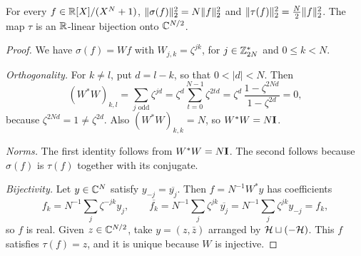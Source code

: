 \begin{lemma}\label{lem:parseval}
For every $f\in\mathbb{R}[X]/(X^N+1)$, $\lVert \sigma(f)\rVert_2^2=N\lVert f\rVert_2^2$ and $\lVert \tau(f)\rVert_2^2=\tfrac N2\lVert f\rVert_2^2$. The map $\tau$ is an $\mathbb{R}$-linear bijection onto $\mathbb{C}^{N/2}$.
\end{lemma}
\begin{proof}
We have $\sigma(f)=Wf$ with $W_{j,k}=\zeta^{jk}$, for $j\in\mathbb{Z}_{2N}^*$ and $0\le k<N$.

\emph{Orthogonality.} For $k\ne l$, put $d=l-k$, so that $0<|d|<N$. Then
\[
  (W^*W)_{k,l}=\sum_{j\text{ odd}}\zeta^{jd}=\zeta^{d}\sum_{t=0}^{N-1}\zeta^{2td}=\zeta^d\,\frac{1-\zeta^{2Nd}}{1-\zeta^{2d}}=0,
\]
because $\zeta^{2Nd}=1\ne\zeta^{2d}$. Also $(W^*W)_{k,k}=N$, so $W^*W=N\mathbf{I}$.

\emph{Norms.} The first identity follows from $W^*W=N\mathbf{I}$. The second follows because $\sigma(f)$ is $\tau(f)$ together with its conjugate.

\emph{Bijectivity.} Let $y\in\mathbb{C}^N$ satisfy $y_{-j}=\overline{y_j}$. Then $f=N^{-1}W^*y$ has coefficients
\[
  f_k=N^{-1}\sum_j\zeta^{-jk}y_j,\qquad \overline{f_k}=N^{-1}\sum_j\zeta^{jk}\,\overline{y_j}=N^{-1}\sum_j\zeta^{jk}y_{-j}=f_k,
\]
so $f$ is real. Given $z\in\mathbb{C}^{N/2}$, take $y=(z,\bar z)$ arranged by $\mathcal{H}\sqcup(-\mathcal{H})$. This $f$ satisfies $\tau(f)=z$, and it is unique because $W$ is injective.
\end{proof}

